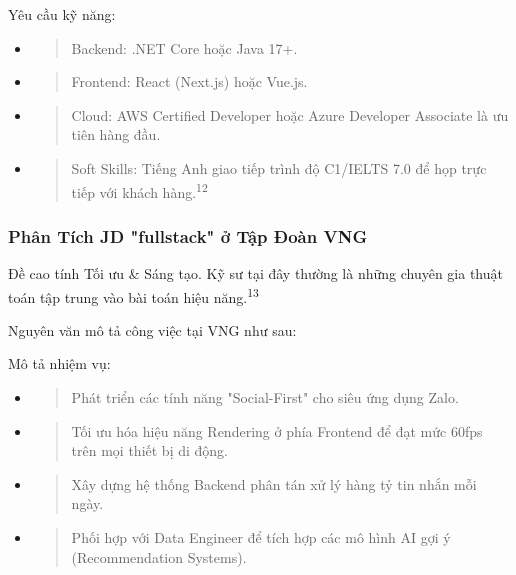 \documentclass[12pt,a4paper]{article}
\begin{document}
Yêu cầu kỹ năng:
\begin{itemize}
\item
  \begin{quote}
  Backend: .NET Core hoặc Java 17+.
  \end{quote}
\item
  \begin{quote}
  Frontend: React (Next.js) hoặc Vue.js.
  \end{quote}
\item
  \begin{quote}
  Cloud: AWS Certified Developer hoặc Azure Developer Associate là ưu tiên hàng đầu.
  \end{quote}
\item
  \begin{quote}
  Soft Skills: Tiếng Anh giao tiếp trình độ C1/IELTS 7.0 để họp trực tiếp với khách hàng.\textsuperscript{12}
  \end{quote}
\end{itemize}

\subsubsection{Phân Tích JD "fullstack" ở Tập Đoàn VNG}

Đề cao tính Tối ưu \& Sáng tạo. Kỹ sư tại đây thường là những chuyên gia thuật toán tập trung vào bài toán hiệu năng.\textsuperscript{13}

Nguyên văn mô tả công việc tại VNG như sau:

Mô tả nhiệm vụ:
\begin{itemize}
\item
  \begin{quote}
  Phát triển các tính năng "Social-First" cho siêu ứng dụng Zalo.
  \end{quote}
\item
  \begin{quote}
  Tối ưu hóa hiệu năng Rendering ở phía Frontend để đạt mức 60fps trên mọi thiết bị di động.
  \end{quote}
\item
  \begin{quote}
  Xây dựng hệ thống Backend phân tán xử lý hàng tỷ tin nhắn mỗi ngày.
  \end{quote}
\item
  \begin{quote}
  Phối hợp với Data Engineer để tích hợp các mô hình AI gợi ý (Recommendation Systems).
  \end{quote}
\end{itemize}
\end{document}
